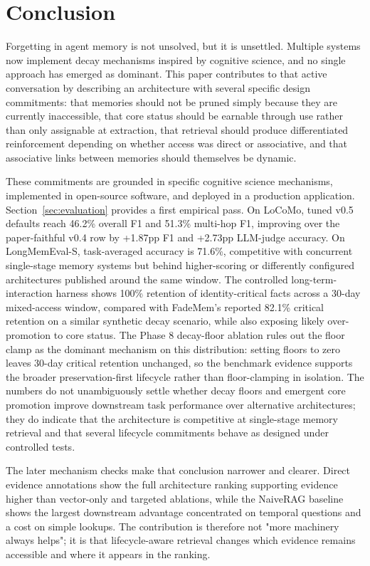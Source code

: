\documentclass[11pt,a4paper]{article}
\begin{document}
\section{Conclusion}

Forgetting in agent memory is not unsolved, but it is unsettled. Multiple systems now implement decay mechanisms inspired by cognitive science, and no single approach has emerged as dominant. This paper contributes to that active conversation by describing an architecture with several specific design commitments: that memories should not be pruned simply because they are currently inaccessible, that core status should be earnable through use rather than only assignable at extraction, that retrieval should produce differentiated reinforcement depending on whether access was direct or associative, and that associative links between memories should themselves be dynamic.

These commitments are grounded in specific cognitive science mechanisms, implemented in open-source software, and deployed in a production application. Section~\ref{sec:evaluation} provides a first empirical pass. On LoCoMo, tuned v0.5 defaults reach 46.2\% overall F1 and 51.3\% multi-hop F1, improving over the paper-faithful v0.4 row by +1.87pp F1 and +2.73pp LLM-judge accuracy. On LongMemEval-S, task-averaged accuracy is 71.6\%, competitive with concurrent single-stage memory systems but behind higher-scoring or differently configured architectures published around the same window. The controlled long-term-interaction harness shows 100\% retention of identity-critical facts across a 30-day mixed-access window, compared with FadeMem's reported 82.1\% critical retention on a similar synthetic decay scenario, while also exposing likely over-promotion to core status. The Phase 8 decay-floor ablation rules out the floor clamp as the dominant mechanism on this distribution: setting floors to zero leaves 30-day critical retention unchanged, so the benchmark evidence supports the broader preservation-first lifecycle rather than floor-clamping in isolation. The numbers do not unambiguously settle whether decay floors and emergent core promotion improve downstream task performance over alternative architectures; they do indicate that the architecture is competitive at single-stage memory retrieval and that several lifecycle commitments behave as designed under controlled tests.

The later mechanism checks make that conclusion narrower and clearer. Direct evidence annotations show the full architecture ranking supporting evidence higher than vector-only and targeted ablations, while the NaiveRAG baseline shows the largest downstream advantage concentrated on temporal questions and a cost on simple lookups. The contribution is therefore not "more machinery always helps"; it is that lifecycle-aware retrieval changes which evidence remains accessible and where it appears in the ranking.
\end{document}
